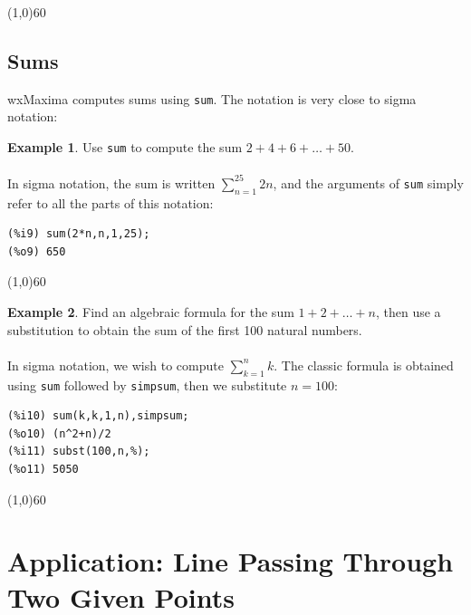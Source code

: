 \documentclass[10.5pt,twoside]{report}
\theoremstyle{definition}
\newtheorem{exmp}{Example}[section]
\begin{document}
\line(1,0){60}
\linethickness{0.5mm}
${}$\\

\subsection{Sums}

wxMaxima computes sums using \verb|sum|.  The notation is very close to sigma notation:

\begin{exmp} Use \verb|sum| to compute the sum $2+4+6+\dots +50$.\\
${}$\\

In sigma notation, the sum is written $\sum_{n=1}^{25} 2n$, and the arguments of \verb|sum| simply refer to all the parts of this notation:

\begin{verbatim}
(%i9) sum(2*n,n,1,25);
(%o9) 650
\end{verbatim}

\end{exmp}

\line(1,0){60}
\linethickness{0.5mm}

\begin{exmp}  Find an algebraic formula for the sum $1+2+\dots +n$, then use a substitution to obtain the sum of the first 100 natural numbers.\\
${}$\\

In sigma notation, we wish to compute $\sum_{k=1}^n k$.  The classic formula is obtained using \verb|sum| followed by \verb|simpsum|, then we substitute $n=100$:

\begin{verbatim}
(%i10) sum(k,k,1,n),simpsum;
(%o10) (n^2+n)/2
(%i11) subst(100,n,%);
(%o11) 5050
\end{verbatim}

\end{exmp}

\line(1,0){60}
\linethickness{0.5mm}
\pagebreak

\section{Application: Line Passing Through Two Given Points}\label{Application:  Line Passing Through Two Given Points}
\end{document}

